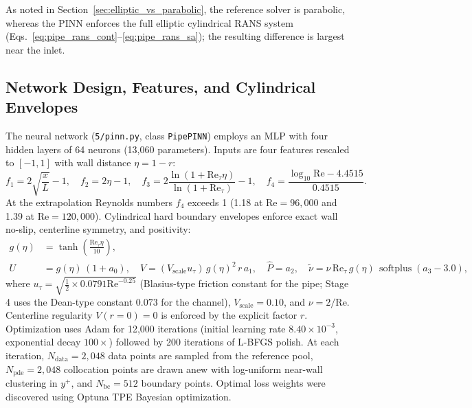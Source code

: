 \documentclass[11pt,a4paper]{article}
\begin{document}
As noted in Section~\ref{sec:elliptic_vs_parabolic}, the reference solver is parabolic, whereas the PINN enforces the full elliptic cylindrical RANS system (Eqs.~\eqref{eq:pipe_rans_cont}--\eqref{eq:pipe_rans_sa}); the resulting difference is largest near the inlet.

\subsection{Network Design, Features, and Cylindrical Envelopes}
The neural network (\texttt{5/pinn.py}, class \texttt{PipePINN}) employs an MLP with four hidden layers of 64 neurons (13,060 parameters). Inputs are four features rescaled to $[-1, 1]$ with wall distance $\eta = 1 - r$:
\begin{equation}
f_1 = 2\sqrt{\frac{x}{L}} - 1, \quad f_2 = 2\eta - 1, \quad f_3 = 2\frac{\ln(1 + \mathrm{Re}_\tau \eta)}{\ln(1 + \mathrm{Re}_\tau)} - 1, \quad f_4 = \frac{\log_{10} \mathrm{Re} - 4.4515}{0.4515}.
\end{equation}
At the extrapolation Reynolds numbers $f_4$ exceeds 1 (1.18 at $\mathrm{Re} = 96{,}000$ and 1.39 at $\mathrm{Re} = 120{,}000$).
Cylindrical hard boundary envelopes enforce exact wall no-slip, centerline symmetry, and positivity:
\begin{align}
g(\eta) &= \tanh\left(\frac{\mathrm{Re}_\tau \eta}{10}\right), \\
U &= g(\eta)\,(1 + a_0), \quad V = (V_{\mathrm{scale}} u_\tau)\,g(\eta)^2\,r\,a_1, \quad \hat{P} = a_2, \quad \tilde{\nu} = \nu\,\mathrm{Re}_\tau\,g(\eta)\,\operatorname{softplus}(a_3 - 3.0),
\end{align}
where $u_\tau = \sqrt{\frac{1}{2}\times 0.0791 \mathrm{Re}^{-0.25}}$ (Blasius-type friction constant for the pipe; Stage 4 uses the Dean-type constant $0.073$ for the channel), $V_{\mathrm{scale}} = 0.10$, and $\nu = 2/\mathrm{Re}$. Centerline regularity $V(r=0) = 0$ is enforced by the explicit factor $r$.
Optimization uses Adam for 12,000 iterations (initial learning rate $8.40\times 10^{-3}$, exponential decay $100\times$) followed by 200 iterations of L-BFGS polish. At each iteration, $N_{\mathrm{data}} = 2{,}048$ data points are sampled from the reference pool, $N_{\mathrm{pde}} = 2{,}048$ collocation points are drawn anew with log-uniform near-wall clustering in $y^+$, and $N_{\mathrm{bc}} = 512$ boundary points. Optimal loss weights were discovered using Optuna TPE Bayesian optimization.
\end{document}

